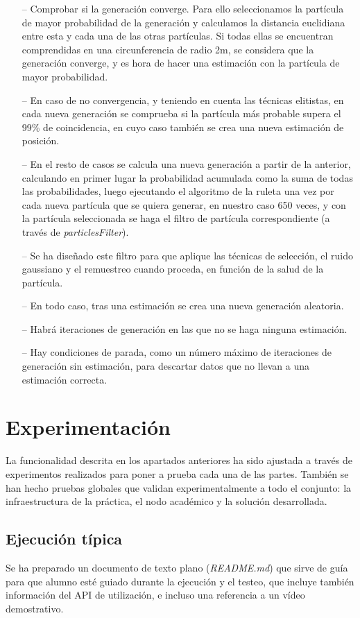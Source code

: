 \begin{itemize}
	\item[--] Comprobar si la generación converge. Para ello seleccionamos la partícula de mayor probabilidad de la generación y calculamos la distancia euclidiana entre esta y cada una de las otras partículas. Si todas ellas se encuentran comprendidas en una circunferencia de radio 2m, se considera que la generación converge, y es hora de hacer una estimación con la partícula de mayor probabilidad.
	\item[--] En caso de no convergencia, y teniendo en cuenta las técnicas elitistas, en cada nueva generación se comprueba si la partícula más probable supera el 99\% de coincidencia, en cuyo caso también se crea una nueva estimación de posición.
	\item[--] En el resto de casos se calcula una nueva generación a partir de la anterior, calculando en primer lugar la probabilidad acumulada como la suma de todas las probabilidades, luego ejecutando el algoritmo de la ruleta una vez por cada nueva partícula que se quiera generar, en nuestro caso 650 veces, y con la partícula seleccionada se haga el filtro de partícula correspondiente (a través de \textit{particlesFilter}).
	\item[--] Se ha diseñado este filtro para que aplique las técnicas de selección, el ruido gaussiano y el remuestreo cuando proceda, en función de la salud de la partícula.
	\item[--] En todo caso, tras una estimación se crea una nueva generación aleatoria.
	\item[--] Habrá iteraciones de generación en las que no se haga ninguna estimación.
	\item[--] Hay condiciones de parada, como un número máximo de iteraciones de generación sin estimación, para descartar datos que no llevan a una estimación correcta. 
\end{itemize}

\section{Experimentación}
La funcionalidad descrita en los apartados anteriores ha sido ajustada a través de experimentos realizados para poner a prueba cada una de las partes. También se han hecho pruebas globales que validan experimentalmente a todo el conjunto: la infraestructura de la práctica, el nodo académico y la solución desarrollada.

\subsection{Ejecución típica}
Se ha preparado un documento de texto plano (\textit{README.md}) que sirve de guía para que alumno esté guiado durante la ejecución y el testeo, que incluye también información del API de utilización, e incluso una referencia a un vídeo demostrativo. 

